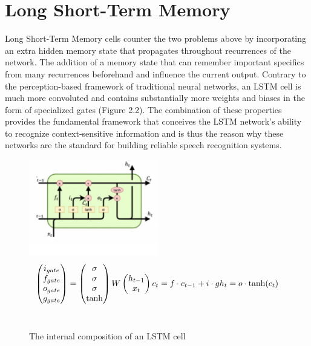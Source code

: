 \section{Long Short-Term Memory}

Long Short-Term Memory cells counter the two problems above by incorporating an extra hidden memory state that propagates throughout recurrences of the network. The addition of a memory state that can remember important specifics from many recurrences beforehand and influence the current output. Contrary to the perception-based framework of traditional neural networks, an LSTM cell is much more convoluted and contains substantially more weights and biases in the form of specialized gates (Figure 2.2). The combination of these properties provides the fundamental framework that conceives the LSTM network’s ability to recognize context-sensitive information and is thus the reason why these networks are the standard for building reliable speech recognition systems. 

\begin{figure}[th]
    \centering
    \includegraphics[width=0.5\textwidth]{Figures/lstmarch.png}
    \begin{displaymath}
    \begin{pmatrix}
        i_{gate} \\ f_{gate} \\ o_{gate} \\ g_{gate}
    \end{pmatrix}
    =
    \begin{pmatrix}
        \sigma \\ \sigma \\ \sigma \\ \tanh
    \end{pmatrix}
    W
    \begin{pmatrix}
        h_{t-1} \\ x_t
    \end{pmatrix} \\
    c_t = f \cdot c_{t-1} + i \cdot g \\
    h_t = o \cdot \tanh(c_t)
    \end{displaymath} \\
    \decoRule
    \caption[LSTM Cell]{The internal composition of an LSTM cell}
    \label{fig:LSTMCell}
\end{figure}

